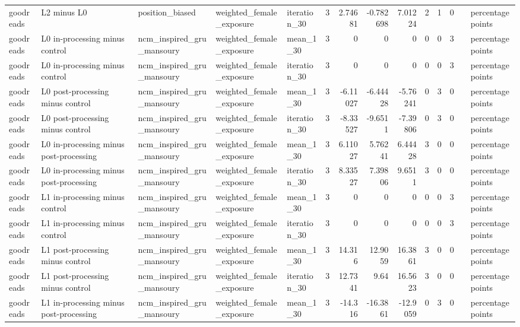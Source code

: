 \begin{table}[htbp!]
\begin{tabular}{lllllrrrrrrrll}
goodreads & L2 minus L0 & position\_biased & weighted\_female\_exposure & iteration\_30 & 3 & 2.74681 & -0.782698 & 7.01224 & 2 & 1 & 0 &  & percentage points \\
goodreads & L0 in-processing minus control & ncm\_inspired\_gru\_mansoury & weighted\_female\_exposure & mean\_1\_30 & 3 & 0 & 0 & 0 & 0 & 0 & 3 &  & percentage points \\
goodreads & L0 in-processing minus control & ncm\_inspired\_gru\_mansoury & weighted\_female\_exposure & iteration\_30 & 3 & 0 & 0 & 0 & 0 & 0 & 3 &  & percentage points \\
goodreads & L0 post-processing minus control & ncm\_inspired\_gru\_mansoury & weighted\_female\_exposure & mean\_1\_30 & 3 & -6.11027 & -6.44428 & -5.76241 & 0 & 3 & 0 &  & percentage points \\
goodreads & L0 post-processing minus control & ncm\_inspired\_gru\_mansoury & weighted\_female\_exposure & iteration\_30 & 3 & -8.33527 & -9.6511 & -7.39806 & 0 & 3 & 0 &  & percentage points \\
goodreads & L0 in-processing minus post-processing & ncm\_inspired\_gru\_mansoury & weighted\_female\_exposure & mean\_1\_30 & 3 & 6.11027 & 5.76241 & 6.44428 & 3 & 0 & 0 &  & percentage points \\
goodreads & L0 in-processing minus post-processing & ncm\_inspired\_gru\_mansoury & weighted\_female\_exposure & iteration\_30 & 3 & 8.33527 & 7.39806 & 9.6511 & 3 & 0 & 0 &  & percentage points \\
goodreads & L1 in-processing minus control & ncm\_inspired\_gru\_mansoury & weighted\_female\_exposure & mean\_1\_30 & 3 & 0 & 0 & 0 & 0 & 0 & 3 &  & percentage points \\
goodreads & L1 in-processing minus control & ncm\_inspired\_gru\_mansoury & weighted\_female\_exposure & iteration\_30 & 3 & 0 & 0 & 0 & 0 & 0 & 3 &  & percentage points \\
goodreads & L1 post-processing minus control & ncm\_inspired\_gru\_mansoury & weighted\_female\_exposure & mean\_1\_30 & 3 & 14.316 & 12.9059 & 16.3861 & 3 & 0 & 0 &  & percentage points \\
goodreads & L1 post-processing minus control & ncm\_inspired\_gru\_mansoury & weighted\_female\_exposure & iteration\_30 & 3 & 12.7341 & 9.64 & 16.5623 & 3 & 0 & 0 &  & percentage points \\
goodreads & L1 in-processing minus post-processing & ncm\_inspired\_gru\_mansoury & weighted\_female\_exposure & mean\_1\_30 & 3 & -14.316 & -16.3861 & -12.9059 & 0 & 3 & 0 &  & percentage points \\

\end{tabular}
\end{table}
